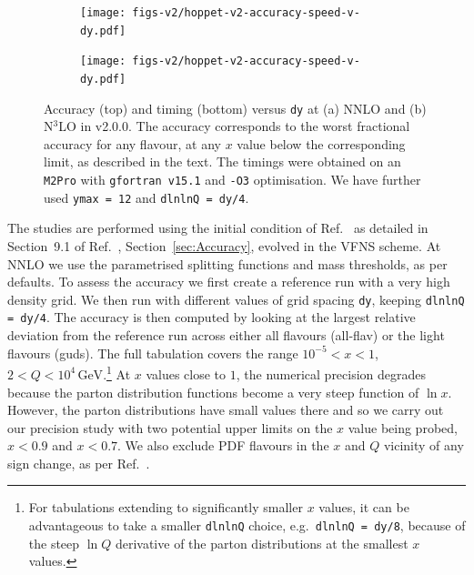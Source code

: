 \begin{figure}[htbp]
    \centering
    \begin{subfigure}{0.49\textwidth}
        \centering
        \texttt{[image: figs-v2/hoppet-v2-accuracy-speed-v-dy.pdf]}
        \caption{}
        \label{fig:main-sub1}
    \end{subfigure}
    \hfill
    \begin{subfigure}{0.49\textwidth}
        \centering
        \texttt{[image: figs-v2/hoppet-v2-accuracy-speed-v-dy.pdf]}
        \caption{}
        \label{fig:main-sub2}
    \end{subfigure}
    \caption{Accuracy (top) and timing (bottom) versus \texttt{dy} at
      (a) NNLO and (b) N$^3$LO in \hoppet{} v2.0.0.
      The accuracy corresponds to the worst fractional accuracy for any flavour,
      at any $x$ value below the corresponding limit, as described in
      the text.
      The timings were
      obtained on an \texttt{M2Pro} with \texttt{gfortran v15.1} and
      \texttt{-O3} optimisation. We have further used \texttt{ymax = 12} and
      \texttt{dlnlnQ = dy/4}.
    }
    \label{fig:main}
\end{figure}

The studies are performed using the initial condition of
Ref.~\cite{Dittmar:2005ed} as detailed in
%
\ifreleasenote
Section~9.1 of Ref.~\cite{Salam:2008qg},
\else
Section~\ref{sec:Accuracy},
\fi
%
evolved in the VFNS scheme.
%
At NNLO we use the parametrised splitting
functions and mass thresholds, as per \hoppet defaults.
%
To
assess the accuracy we first create a reference run with a very high
density grid. We then run \hoppet{} with different values of grid
spacing \texttt{dy}, keeping \texttt{dlnlnQ = dy/4}.
%
The accuracy is then computed by looking at the largest relative
deviation from the reference run across either all flavours (all-flav)
or the light flavours (guds).
%
The full tabulation covers the range $10^{-5} < x < 1$,
$2 < Q < 10^4\, \text{GeV}$.\footnote{For tabulations extending to
  significantly smaller $x$ values, it can be advantageous to take a
  smaller \texttt{dlnlnQ} choice, e.g.\ \texttt{dlnlnQ = dy/8},
  because of the steep $\ln Q$ derivative of the parton
  distributions at the smallest $x$ values.}
%
At $x$ values close to $1$, the numerical precision degrades because the
parton distribution functions become a very steep function of $\ln
x$.
%
However, the parton distributions have small values there and so we
carry out our precision study with two potential upper limits on the
$x$ value being probed, $x < 0.9$ and $x < 0.7$.
%
We also exclude PDF flavours in the $x$ and $Q$ vicinity of any sign
change, as per Ref.~\cite{Salam:2008qg}.

